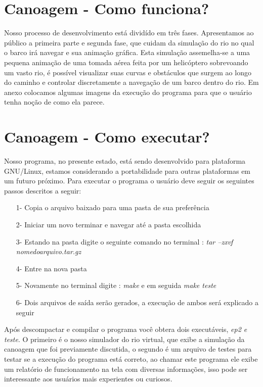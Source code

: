 \documentclass[a4paper,11pt]{article}
\begin{document}
\section{Canoagem - Como funciona?}
Nosso processo de desenvolvimento está dividído em três fases. Apresentamos ao público a primeira parte e segunda fase, que cuidam da simula\c{c}ão do rio no qual o barco irá navegar e sua animação gráfica. Esta simula\c{c}ão assemelha-se a uma pequena anima\c{c}ão de uma tomada aérea feita por um helicóptero sobrevoando um vasto rio, é possível visualizar suas curvas e obstáculos que surgem ao longo do caminho e controlar discretamente a navegação de um barco dentro do rio. Em anexo colocamos algumas imagens da execu\c{c}ão do programa para que o usuário tenha no\c{c}ão de como ela parece.


\section{Canoagem - Como executar?}
Nosso programa, no presente estado, está sendo desenvolvido para plataforma GNU/Linux, estamos considerando a portabilidade para outras plataformas em um futuro próximo. Para executar o programa o usuário deve seguir os seguintes passos descritos a seguir:

\begin{enumerate}
\item[1-]{Copia o arquivo baixado para uma pasta de sua preferência}
\item[2-]{Iniciar um novo terminar e navegar até a pasta escolhida}
\item[3-]{Estando na pasta digite o seguinte comando no terminal : \textit{tar --zxvf nomedoarquivo.tar.gz}}
\item[4-]{Entre na nova pasta}
\item[5-]{Novamente no terminal digite : \textit{make} e em seguida \textit{make teste}}
\item[6-]{Dois arquivos de saída serão gerados, a execu\c{c}ão de ambos será explicado a seguir}
\end{enumerate}

Após descompactar e compilar o programa você obtera dois executáveis, \textit{ep2 e teste}. O primeiro é o nosso simulador do rio virtual, que exibe a simulação da canoagem que foi previamente discutida, o segundo é um arquivo de testes para testar se a execu\c{c}ão do programa está correto, ao chamar este programa ele exibe um relatório de funcionamento na tela com diversas informa\c{c}ões, isso pode ser interessante aos usuários mais experientes ou curiosos. 
\end{document}
